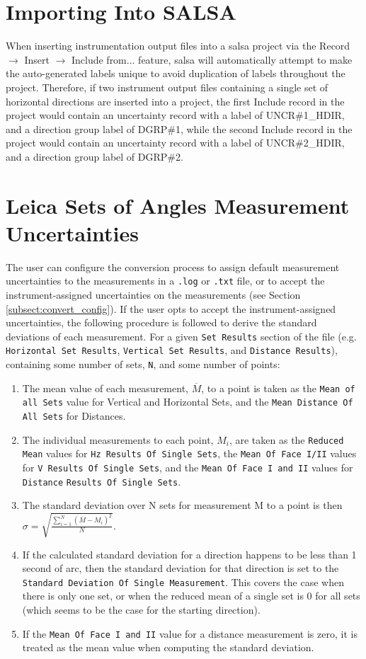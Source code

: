 \section*{Importing Into SALSA}
When inserting instrumentation output files into a \textsf{salsa} project via the Record $\to$ Insert $\to$ Include from... feature, \textsf{salsa} will automatically attempt to make the auto-generated labels unique to avoid duplication of labels throughout the project.  Therefore, if two instrument output files containing a single set of horizontal directions are inserted into a project, the first Include record in the project would contain an uncertainty record with a label of UNCR\#1\_HDIR, and a direction group label of DGRP\#1, while the second Include record in the project would contain an uncertainty record with a label of UNCR\#2\_HDIR, and a direction group label of DGRP\#2.

\section*{Leica Sets of Angles Measurement Uncertainties}
The user can configure the conversion process to assign default measurement uncertainties to the measurements in a \verb+.log+ or \verb+.txt+ file, or to accept the instrument-assigned uncertainties on the measurements (see Section \ref{subsect:convert_config}).  If the user opts to accept the instrument-assigned uncertainties, the following procedure is followed to derive the standard deviations of each measurement.  For a given \verb+Set Results+ section of the file (e.g. \verb+Horizontal Set Results+, \verb+Vertical Set Results+, and \verb+Distance Results+), containing some number of sets, \verb+N+, and some number of points:
\begin{enumerate}
\item The mean value of each measurement, $\overline{M}$, to a point is taken as the \verb+Mean of all Sets+ value for Vertical and Horizontal Sets, and the \verb+Mean Distance Of All Sets+ for Distances.
\item The individual measurements to each point, $M_{i}$, are taken as the \verb+Reduced Mean+ values for \verb+Hz Results Of Single Sets+, the \verb+Mean Of Face I/II+ values for \verb+V Results Of Single Sets+, and the \verb+Mean Of Face I and II+ values for \verb+Distance+ \verb+Results Of Single Sets+.
\item The standard deviation over N sets for measurement M to a point is then $\sigma=\sqrt{\frac{\sum_{i=1}^{N}\left(\overline{M}-M_{i}\right)^2}{N}}$.
\item If the calculated standard deviation for a direction happens to be less than 1 second of arc, then the standard deviation for that direction is set to the \verb+Standard Deviation Of Single Measurement+.  This covers the case when there is only one set, or when the reduced mean of a single set is 0 for all sets (which seems to be the case for the starting direction).
\item If the \verb+Mean Of Face I and II+ value for a distance measurement is zero, it is treated as the mean value when computing the standard deviation.
\end{enumerate}


